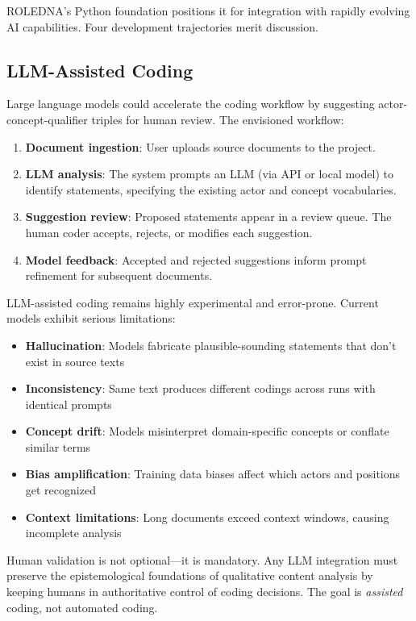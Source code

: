 \documentclass[../main.tex]{subfiles}
\begin{document}
ROLEDNA's Python foundation positions it for integration with rapidly evolving AI capabilities. Four development trajectories merit discussion.

\subsection{LLM-Assisted Coding}

Large language models could accelerate the coding workflow by suggesting actor-concept-qualifier triples for human review. The envisioned workflow:

\begin{enumerate}
\item \textbf{Document ingestion}: User uploads source documents to the project.
\item \textbf{LLM analysis}: The system prompts an LLM (via API or local model) to identify statements, specifying the existing actor and concept vocabularies.
\item \textbf{Suggestion review}: Proposed statements appear in a review queue. The human coder accepts, rejects, or modifies each suggestion.
\item \textbf{Model feedback}: Accepted and rejected suggestions inform prompt refinement for subsequent documents.
\end{enumerate}

\begin{criticalbox}
LLM-assisted coding remains highly experimental and error-prone. Current models exhibit serious limitations:
\begin{itemize}[leftmargin=*, itemsep=0.2em]
\item \textbf{Hallucination}: Models fabricate plausible-sounding statements that don't exist in source texts
\item \textbf{Inconsistency}: Same text produces different codings across runs with identical prompts
\item \textbf{Concept drift}: Models misinterpret domain-specific concepts or conflate similar terms
\item \textbf{Bias amplification}: Training data biases affect which actors and positions get recognized
\item \textbf{Context limitations}: Long documents exceed context windows, causing incomplete analysis
\end{itemize}
Human validation is not optional---it is mandatory. Any LLM integration must preserve the epistemological foundations of qualitative content analysis by keeping humans in authoritative control of coding decisions. The goal is \emph{assisted} coding, not automated coding.
\end{criticalbox}
\end{document}
